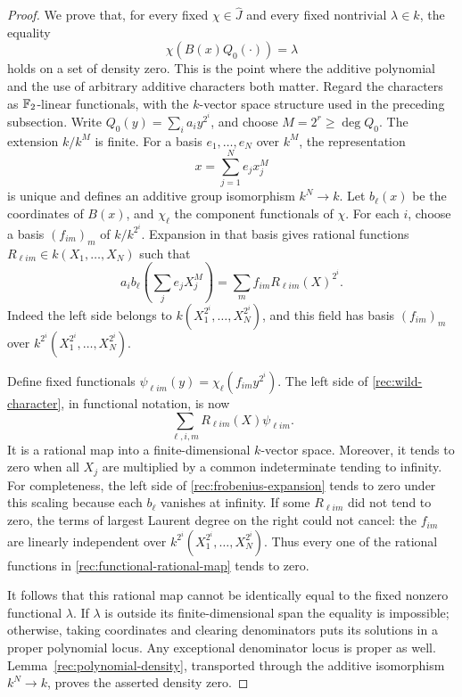 \begin{proof}
We prove that, for every fixed \(\chi\in\widehat J\) and every fixed
nontrivial \(\lambda\in\widehat k\), the equality
\begin{equation}\label{rec:wild-character}
 \chi(B(x)Q_0(\cdot))=\lambda
\end{equation}
holds on a set of density zero.  This is the point where the additive
polynomial and the use of arbitrary additive characters both matter.
Regard the characters as \(\mathbb F_2\)-linear functionals, with the
\(k\)-vector space structure used in the preceding subsection.  Write
\(Q_0(y)=\sum_i a_i y^{2^i}\), and choose \(M=2^r\geq\deg Q_0\).
The extension \(k/k^M\) is finite.  For a basis \(e_1,\ldots,e_N\)
over \(k^M\), the representation
\[
 x=\sum_{j=1}^N e_jx_j^M
\]
is unique and defines an additive group isomorphism \(k^N\to k\).
Let \(b_\ell(x)\) be the coordinates of \(B(x)\), and
\(\chi_\ell\) the component functionals of \(\chi\).  For each
\(i\), choose a basis \((f_{im})_m\) of \(k/k^{2^i}\).  Expansion in
that basis gives rational functions \(R_{\ell im}\in k(X_1,\ldots,X_N)\)
such that
\begin{equation}\label{rec:frobenius-expansion}
 a_i b_\ell\left(\sum_j e_jX_j^M\right)
       =\sum_m f_{im}R_{\ell im}(X)^{2^i}.
\end{equation}
Indeed the left side belongs to
\(k(X_1^{2^i},\ldots,X_N^{2^i})\), and this field has basis
\((f_{im})_m\) over \(k^{2^i}(X_1^{2^i},\ldots,X_N^{2^i})\).

Define fixed functionals
\(\psi_{\ell im}(y)=\chi_\ell(f_{im}y^{2^i})\).  The left side of
\eqref{rec:wild-character}, in functional notation, is now
\begin{equation}\label{rec:functional-rational-map}
 \sum_{\ell,i,m}R_{\ell im}(X)\psi_{\ell im}.
\end{equation}
It is a rational map into a finite-dimensional \(k\)-vector space.
Moreover, it tends to zero when all \(X_j\) are multiplied by a common
indeterminate tending to infinity.  For completeness, the left side of
\eqref{rec:frobenius-expansion} tends to zero under this scaling because
each \(b_\ell\) vanishes at infinity.  If some
\(R_{\ell im}\) did not tend to zero, the terms of largest Laurent
degree on the right could not cancel: the \(f_{im}\) are linearly
independent over
\(k^{2^i}(X_1^{2^i},\ldots,X_N^{2^i})\).  Thus every one of the
rational functions in \eqref{rec:functional-rational-map} tends to
zero.

It follows that this rational map cannot be identically equal to the
fixed nonzero functional \(\lambda\).  If \(\lambda\) is outside its
finite-dimensional span the equality is impossible; otherwise, taking
coordinates and clearing denominators puts its solutions in a proper
polynomial locus.  Any exceptional denominator locus is proper as well.
Lemma~\ref{rec:polynomial-density}, transported through the additive
isomorphism \(k^N\to k\), proves the asserted density zero.


\end{proof}
